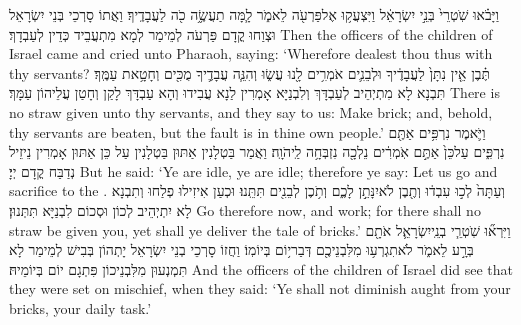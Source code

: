 {וַיָּבֹ֗אוּ שֹֽׁטְרֵי֙ בְּנֵ֣י יִשְׂרָאֵ֔ל וַיִּצְעֲק֥וּ אֶל\maqqaf פַּרְעֹ֖ה לֵאמֹ֑ר לָ֧מָּה תַעֲשֶׂ֦ה כֹ֖ה לַעֲבָדֶֽיךָ׃}
{וַאֲתוֹ סָרְכֵי בְּנֵי יִשְׂרָאֵל וּצְוַחוּ קֳדָם פַּרְעֹה לְמֵימַר לְמָא מִתְעֲבֵיד כְּדֵין לְעַבְדָךְ׃}
{Then the officers of the children of Israel came and cried unto Pharaoh, saying: ‘Wherefore dealest thou thus with thy servants?}{}
{תֶּ֗בֶן אֵ֤ין נִתָּן֙ לַעֲבָדֶ֔יךָ וּלְבֵנִ֛ים אֹמְרִ֥ים לָ֖נוּ עֲשׂ֑וּ וְהִנֵּ֧ה עֲבָדֶ֛יךָ מֻכִּ֖ים וְחָטָ֥את עַמֶּֽךָ׃}
{תִּבְנָא לָא מִתְיְהֵיב לְעַבְדָּךְ וְלִבְנַיָּא אָמְרִין לַנָא עֲבִידוּ וְהָא עַבְדָּךְ לָקַן וְחָטַן עֲלֵיהוֹן עַמָּךְ׃}
{There is no straw given unto thy servants, and they say to us: Make brick; and, behold, thy servants are beaten, but the fault is in thine own people.’}{}
{וַיֹּ֛אמֶר נִרְפִּ֥ים אַתֶּ֖ם נִרְפִּ֑ים עַל\maqqaf כֵּן֙ אַתֶּ֣ם אֹֽמְרִ֔ים נֵלְכָ֖ה נִזְבְּחָ֥ה לַֽיהֹוָֽה׃}
{וַאֲמַר בַּטְלָנִין אַתּוּן בַּטְלָנִין עַל כֵּן אַתּוּן אָמְרִין נֵיזֵיל נְדַבַּח קֳדָם יְיָ׃}
{But he said: ‘Ye are idle, ye are idle; therefore ye say: Let us go and sacrifice to the \lord.}{}
{וְעַתָּה֙ לְכ֣וּ עִבְד֔וּ וְתֶ֖בֶן לֹא\maqqaf יִנָּתֵ֣ן לָכֶ֑ם וְתֹ֥כֶן לְבֵנִ֖ים תִּתֵּֽנוּ׃}
{וּכְעַן אִיזִילוּ פְלַחוּ וְתִבְנָא לָא יִתְיְהֵיב לְכוֹן וּסְכוֹם לִבְנַיָּא תִּתְּנוּן׃}
{Go therefore now, and work; for there shall no straw be given you, yet shall ye deliver the tale of bricks.’}{}
{וַיִּרְא֞וּ שֹֽׁטְרֵ֧י בְנֵֽי\maqqaf יִשְׂרָאֵ֛ל אֹתָ֖ם בְּרָ֣ע לֵאמֹ֑ר לֹא\maqqaf תִגְרְע֥וּ מִלִּבְנֵיכֶ֖ם דְּבַר\maqqaf י֥וֹם בְּיוֹמֽוֹ׃}
{וַחֲזוֹ סָרְכֵי בְנֵי יִשְׂרָאֵל יָתְהוֹן בְּבִישׁ לְמֵימַר לָא תִּמְנְעוּן מִלִּבְנֵיכוֹן פִּתְגָם יוֹם בְּיוֹמֵיהּ׃}
{And the officers of the children of Israel did see that they were set on mischief, when they said: ‘Ye shall not diminish aught from your bricks, your daily task.’}{}
